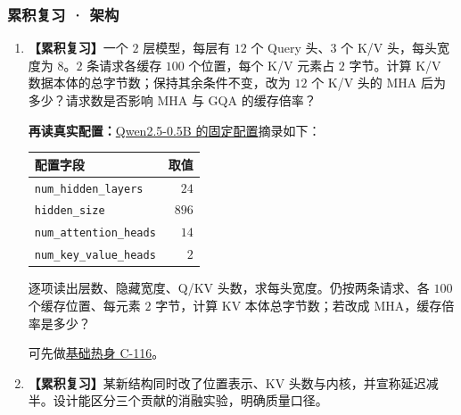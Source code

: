 \subsubsection*{累积复习 · 架构}
\begin{enumerate}[label={},leftmargin=4.8em,itemsep=4pt]
\item[\textbf{R-13.}] \leavevmode{}\label{exercise:R-13}\label{exercise:review-gqa-budget}\textbf{【累积复习】}一个 $2$ 层模型，每层有 $12$ 个 Query 头、$3$ 个 K/V 头，每头宽度为 $8$。$2$ 条请求各缓存 $100$ 个位置，每个 K/V 元素占 $2$ 字节。计算 K/V 数据本体的总字节数；保持其余条件不变，改为 $12$ 个 K/V 头的 MHA 后为多少？请求数是否影响 MHA 与 GQA 的缓存倍率？
\par\textbf{再读真实配置：}\hyperref[source:qwen-config]{Qwen2.5-0.5B 的固定配置}摘录如下：
\begin{center}\small
{}
\begin{tabular}{@{}lr@{}}\toprule
配置字段 & 取值\\\midrule
\texttt{num\_hidden\_layers} & $24$\\
\texttt{hidden\_size} & $896$\\
\texttt{num\_attention\_heads} & $14$\\
\texttt{num\_key\_value\_heads} & $2$\\\bottomrule
\end{tabular}
\end{center}
逐项读出层数、隐藏宽度、Q/KV 头数，求每头宽度。仍按两条请求、各 $100$ 个缓存位置、每元素 $2$ 字节，计算 KV 本体总字节数；若改成 MHA，缓存倍率是多少？\par 可先做\hyperref[exercise:moe-routing]{基础热身 C-116}。
\item[\textbf{R-14.}] \leavevmode{}\label{exercise:R-14}\label{exercise:review-architecture-ablation}\textbf{【累积复习】}某新结构同时改了位置表示、KV 头数与内核，并宣称延迟减半。设计能区分三个贡献的消融实验，明确质量口径。
\end{enumerate}
